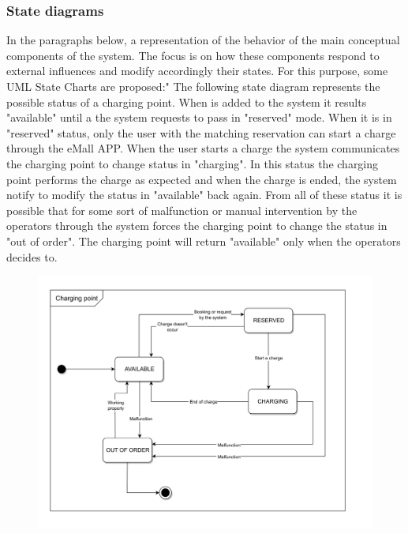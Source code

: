\subsubsection{State diagrams}
In the paragraphs below, a representation of the behavior of the main conceptual
components of the system. The focus is on how these components respond to
external influences and modify accordingly their states. For this purpose,
some UML State Charts are proposed:"
The following state diagram represents the possible status of a charging point. 
When is added to the system it results "available" until a the system requests to pass in "reserved" mode. 
When it is in "reserved" status, only the user with the matching reservation can start a charge through the eMall APP. 
When the user starts a charge the system communicates the charging point to change status in "charging". In this status
the charging point performs the charge as expected and when the charge is ended, the system notify to modify the status 
in "available" back again. From all of these status it is possible that for some sort of malfunction or manual intervention
by the operators through the system forces the charging point to change the status in "out of order". The charging point will return "available"
only when the operators decides to. 

\begin{figure}[h]
      \centering
      \includegraphics[scale=0.25]{src/state_diagram/cp.png}
\end{figure} \vspace{1cm}

